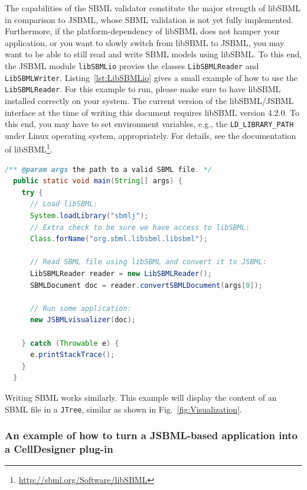\documentclass[
  BCOR12mm,
  letterpaper,
  11pt,
  headsepline,
  pointlessnumbers,
  tablecaptionabove,
  onelinecaption,
  headinclude,
  appendixprefix,
  idxtotoc,
  bibtotoc,
  twoside,
  titlepage
]{scrartcl}
\begin{document}
The capabilities of the SBML validator constitute the
major strength of libSBML \citep{Bornstein2008} in comparison to JSBML, whose
SBML validation is not yet fully implemented. Furthermore, if the
platform-dependency of libSBML does not hamper your application, or you want to
slowly switch from libSBML to JSBML, you may want to be able to still read and
write SBML models using libSBML. To this end, the JSBML module
\texttt{libSBMLio} provies the classes \texttt{LibSBMLReader}
and \texttt{LibSBMLWriter}.
Listing~\vref{lst:LibSBMLio} gives a small example of how to use the
\texttt{LibSBMLReader}. For this example to run, please make sure to have
libSBML installed correctly on your system. The current version of the
libSBML/JSBML interface at the time of writing this document requires libSBML
version 4.2.0.
To this end, you may have to set environment variables, e.g., the
\texttt{LD\_LIBRARY\_PATH}
under Linux operating system, appropriately. For
details, see the documentation of
libSBML\footnote{\url{http://sbml.org/Software/libSBML}}.
\begin{lstlisting}[language=Java,float,caption={A simple example for
converting libSBML data structures into JSBML data objects},label=lst:LibSBMLio]
  /** @param args the path to a valid SBML file. */
  public static void main(String[] args) {
    try {
      // Load libSBML:
      System.loadLibrary("sbmlj");
      // Extra check to be sure we have access to libSBML:
      Class.forName("org.sbml.libsbml.libsbml");

      // Read SBML file using libSBML and convert it to JSBML:
      LibSBMLReader reader = new LibSBMLReader();
      SBMLDocument doc = reader.convertSBMLDocument(args[0]);

      // Run some application:
      new JSBMLvisualizer(doc);

    } catch (Throwable e) {
      e.printStackTrace();
    }
  }
\end{lstlisting}
Writing SBML works similarly. This example will display the content of an SBML
file in a \texttt{JTree}, similar as shown in Fig.~\vref{fig:Visualization}.

\subsubsection{An example of how to turn a JSBML-based application into a
CellDesigner plug-in}
\end{document}

